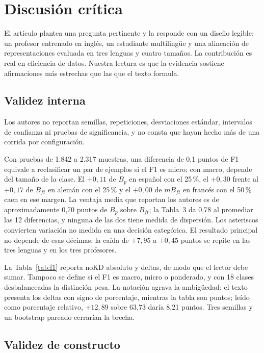 \section{Discusión crítica}
\label{sec:discusion}

El artículo \cite{piperno2025} plantea una pregunta pertinente y la responde con un diseño legible: un profesor entrenado en inglés, un estudiante multilingüe y una alineación de representaciones evaluada en tres lenguas y cuatro tamaños. La contribución es real en eficiencia de datos. Nuestra lectura es que la evidencia sostiene afirmaciones más estrechas que las que el texto formula.

\subsection{Validez interna}

Los autores no reportan semillas, repeticiones, desviaciones estándar, intervalos de confianza ni pruebas de significancia, y no consta que hayan hecho más de una corrida por configuración.

Con pruebas de 1.842 a 2.317 muestras, una diferencia de 0,1 puntos de F1 equivale a reclasificar un par de ejemplos si el F1 es micro; con macro, depende del tamaño de la clase. El $+0{,}11$ de $B_p$ en español con el 25\,\%, el $+0{,}30$ frente al $+0{,}17$ de $B_{ft}$ en alemán con el 25\,\% y el $+0{,}00$ de $mB_{ft}$ en francés con el 50\,\% caen en ese margen. La ventaja media que reportan los autores es de aproximadamente 0,70 puntos de $B_p$ sobre $B_{ft}$; la Tabla~3 da 0,78 al promediar las 12 diferencias, y ninguna de las dos tiene medida de dispersión. Los asteriscos convierten variación no medida en una decisión categórica. El resultado principal no depende de esas décimas: la caída de $+7{,}95$ a $+0{,}45$ puntos se repite en las tres lenguas y en los tres profesores.

La Tabla~\ref{tab:f1} reporta noKD absoluto y deltas, de modo que el lector debe sumar. Tampoco se define si el F1 es macro, micro o ponderado, y con 18 clases desbalanceadas la distinción pesa. La notación agrava la ambigüedad: el texto presenta los deltas con signo de porcentaje, mientras la tabla son puntos; leído como porcentaje relativo, $+12{,}89$ sobre 63,73 daría 8,21 puntos. Tres semillas y un bootstrap pareado cerrarían la brecha.

\subsection{Validez de constructo}

